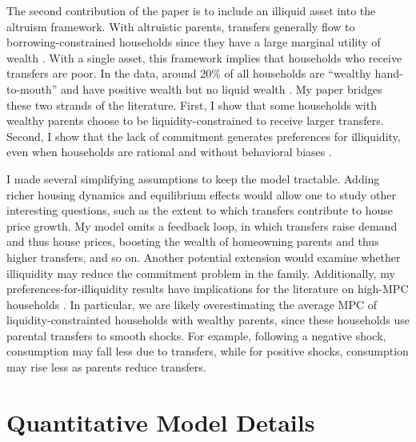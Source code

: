 \documentclass[12pt]{article}
\begin{document}
The second contribution of the paper is to include an illiquid asset into the altruism framework. With altruistic parents, transfers generally flow to borrowing-constrained households since they have a large marginal utility of wealth \citep{Barczyk2020,Chu2020}. With a single asset, this framework implies that households who receive transfers are poor. In the data, around 20\% of all households are ``wealthy hand-to-mouth'' and have positive wealth but no liquid wealth \citep{Kaplan2014a,Attanasio2018}. My paper bridges these two strands of the literature. First, I show that some households with wealthy parents choose to be liquidity-constrained to receive larger transfers. Second, I show that the lack of commitment generates preferences for illiquidity, even when households are rational and without behavioral biases \citep[see e.g.,][]{attanasio2024temptation}. 

I made several simplifying assumptions to keep the model tractable. Adding richer housing dynamics and equilibrium effects would allow one to study other interesting questions, such as the extent to which transfers contribute to house price growth. My model omits a feedback loop, in which transfers raise demand and thus house prices, boosting the wealth of homeowning parents and thus higher transfers, and so on. Another potential extension would examine whether illiquidity may reduce the commitment problem in the family. Additionally, my preferences-for-illiquidity results have implications for the literature on high-MPC households \citep[see e.g.,][]{kaplan2022marginal}. In particular, we are likely overestimating the average MPC of liquidity-constrainted households with wealthy parents, since these households use parental transfers to smooth shocks. For example, following a negative shock, consumption may fall less due to transfers, while for positive shocks, consumption may rise less as parents reduce transfers.

\newpage
\begingroup\singlespacing


\endgroup
\newpage


\appendix

\setcounter{figure}{0}
\renewcommand{\thefigure}{A\arabic{figure}}
\setcounter{table}{0}
\renewcommand{\thetable}{A\arabic{table}}

\section{Quantitative Model Details} 
\end{document}
